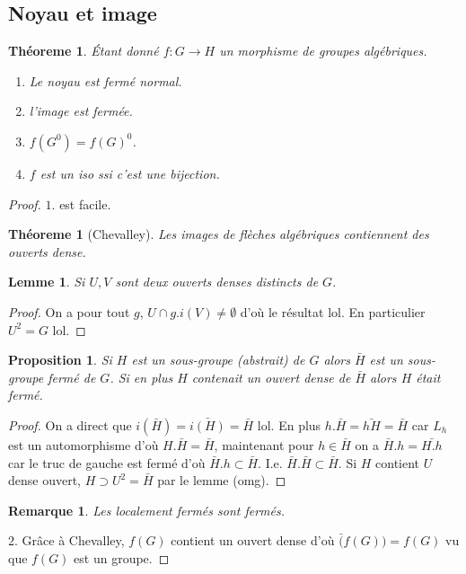 \documentclass[a4paper,12pt]{book}
\theoremstyle{plain}
\newtheorem{thm}[subsection]{Théoreme}
\newtheorem{lem}[subsection]{Lemme}
\newtheorem{prop}[subsection]{Proposition}
\newtheorem{rem}{Remarque}
\theoremstyle{definition}
\theoremstyle{remark}
\begin{document}
\subsection{Noyau et image}
\begin{thm}
  Étant donné $f\colon G\to H$ un morphisme de groupes algébriques.
  \begin{enumerate}
    \item Le noyau est fermé normal.
    \item l'image est fermée.
    \item $f(G^0)=f(G)^0$.
    \item $f$ est un iso ssi c'est une bijection.
  \end{enumerate}
\end{thm}
\begin{proof}
  $1.$ est facile.\\
  \begin{thm}[Chevalley]
    Les images de flèches algébriques contiennent des ouverts
    dense.
  \end{thm}
  \begin{lem}
    Si $U,V$ sont deux ouverts denses distincts de $G$.
  \end{lem}
  \begin{proof}
    On a pour tout $g$, $U\cap g.i(V)\ne \emptyset$ d'où le
    résultat lol. En particulier $U^2=G$ lol.
  \end{proof}
  \begin{prop}
    Si $H$ est un sous-groupe (abstrait) de $G$ alors 
    $\bar H$ est un sous-groupe fermé de $G$. Si en plus $H$
    contenait un ouvert dense de $\bar H$ alors $H$ était fermé.
  \end{prop}
  \begin{proof}
    On a direct que $i(\bar H)=\bar{i(H)}=\bar H$ lol. En plus
    $h.\bar H=\bar{hH}=\bar H$ car $L_h$ est un automorphisme
    d'où $H.\bar H=\bar H$, maintenant pour $h\in \bar H$ on a
    $\bar H.h=\bar{H.h}$ car le truc de gauche est fermé d'où
    $\bar H.h\subset \bar H$. I.e. $\bar H.\bar H\subset\bar H$.
    Si $H$ contient $U$ dense ouvert, $H\supset U^2=\bar H$ par le
    lemme (omg).
  \end{proof}
  \begin{rem}
    Les localement fermés sont fermés.
  \end{rem}
  $2.$ Grâce à Chevalley, $f(G)$ contient un ouvert dense d'où
  $\bar(f(G))=f(G)$ vu que $f(G)$ est un groupe.
\end{proof}
\end{document}
